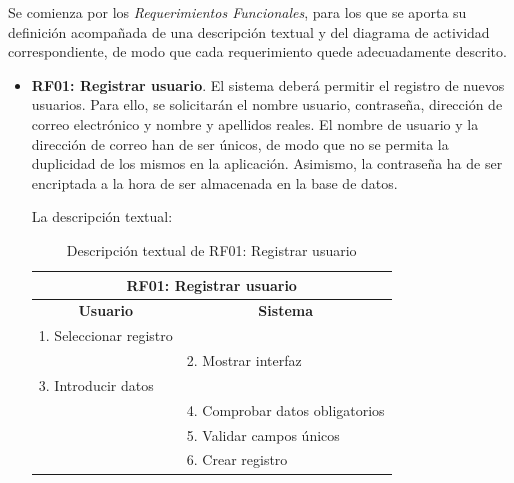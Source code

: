 Se comienza por los \emph{Requerimientos Funcionales}, para los que se aporta su definición acompañada de una descripción textual y del diagrama de actividad correspondiente, de modo que cada requerimiento quede adecuadamente descrito.

\begin{itemize}
	\item \textbf{RF01: Registrar usuario}. El sistema deberá permitir el registro de nuevos usuarios. Para ello, se solicitarán el nombre usuario, contraseña, dirección de correo electrónico y nombre y apellidos reales. El nombre de usuario y la dirección de correo han de ser únicos, de modo que no se permita la duplicidad de los mismos en la aplicación. Asimismo, la contraseña ha de ser encriptada a la hora de ser almacenada en la base de datos.
	
	La descripción textual:
	\begin{table}[h]
		\centering	
		\begin{tabular}{|l|l|}
			\hline
			\multicolumn{2}{|c|}{\textbf{RF01: Registrar usuario}} \\ \hline
			\multicolumn{1}{|c|}{\textbf{Usuario}} & \multicolumn{1}{c|}{\textbf{Sistema}} \\ \hline
			1. Seleccionar registro &\\ \hline
			& 2. Mostrar interfaz \\ \hline
			3. Introducir datos &\\ \hline
			& 4. Comprobar datos obligatorios \\ \hline
			& 5. Validar campos únicos\\ \hline
			& 6. Crear registro \\ \hline
		\end{tabular}
		\caption{Descripción textual de RF01: Registrar usuario}
		\label{tab:tablaDescTextualRF01}
	\end{table}
	

\end{itemize}
